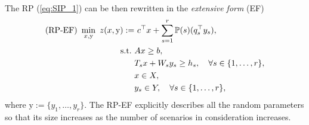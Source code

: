 The RP (\ref{eq:SIP_1}) can be then rewritten in the \textit{extensive form} (EF)
\begin{subequations}\label{sip:ef}
\begin{align}
\textrm{(RP-EF) }\min_{x,\mathrm{y}}\ z(x,\mathrm{y}):=&\ c^{\top}x + \sum_{s=1}^{r}\operatorname*{\mathbb{P}}(s) (q_s^{\top}y_s), \label{ef:obj}\\ 
\mathrm{s.t.}\ &Ax\ge b,  \label{ef:b}\\
	&T_s x+W_s y_s\ge h_s,\quad\forall s\in\{1,\ldots,r\}, \label{ef:c} \\
	&x\in X, \label{ef:d} \\
	&y_s \in Y,\quad\forall s\in\{1,\ldots,r\}, \label{ef:e}
\end{align}
\end{subequations}
where $\mathrm{y}:=\{y_1,\ldots,y_r\}$. The RP-EF explicitly describes all the random parameters so that its size increases as the number of scenarios in consideration increases.
